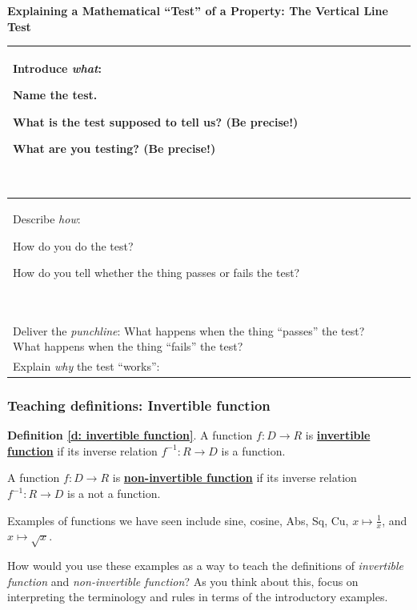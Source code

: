\documentclass[11pt]{article}
\newcommand{\handout}{\subsubsection}
\renewcommand\emph[1]{\underline{\bf{#1}}} %
\theoremstyle{definition}
\begin{document}
\begin{center}
{\bf Explaining a Mathematical ``Test'' of a Property: The Vertical Line Test}

\begin{tabular}{|L{2.5in}|L{4in}|}
\hline 
Introduce {\it what}:	
	\begin{itemize*}
	\item Name the test.
	\item What is the test supposed to tell us? (Be precise!) 
	\item What are you testing? (Be precise!) 
	\end{itemize*} \vspace*{-12pt}$\;$
	& 

	\\ \hline 
Describe {\it how}:
	\begin{itemize*}
	\item How do you do the test?
	\item How do you tell whether the thing passes or fails the test?
	\end{itemize*} \vspace*{-12pt}$\;$
	& 

	\\ \hline 
Deliver the {\it punchline}: What happens when the thing ``passes'' the test? What happens when the thing ``fails'' the test?
	& 

	 \\ \hline 
Explain {\it why} the test ``works'': 
	& \vspace*{2in}\\ 
	\hline 
\end{tabular}
\end{center}

\newpage \handout{Teaching definitions: Invertible function}

\begin{mdframed}\raggedright
{\bf Definition \ref{d: invertible function}}.
 A function $f:D\to R$ is \emph{invertible function} if its inverse relation $f^{-1}:R\to D$ is a function.

A function $f:D\to R$ is \emph{non-invertible function} if its inverse relation $f^{-1}:R\to D$ is a not a function.
\end{mdframed}

Examples of functions we have seen include sine, cosine, Abs, Sq, Cu, $x\mapsto \frac{1}{x}$, and $x\mapsto \sqrt{x}$. 

How would you use these examples as a way to teach the definitions of {\it invertible function} and {\it non-invertible function}? As you think about this, focus on interpreting the terminology and rules in terms of the introductory examples.
\end{document}
